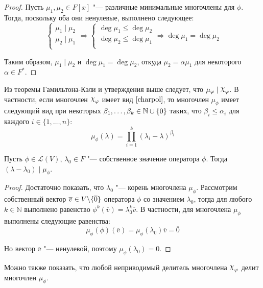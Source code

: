 \begin{proof}
	Пусть $\mu_1, \mu_2 \in F[x]$ "--- различные минимальные многочлены для $\phi$. Тогда, поскольку оба они ненулевые, выполнено следующее:
	\[\left\{\begin{aligned}
		\mu_1\mid \mu_2\\
		\mu_2\mid \mu_1\\
	\end{aligned}\right. \Rightarrow
	\left\{\begin{aligned}
		\deg{\mu_1} \le \deg{\mu_2}\\
		\deg{\mu_2} \le \deg{\mu_1}\\
	\end{aligned}\right. \Rightarrow \deg{\mu_1} = \deg{\mu_2}\]
	
	Таким образом, $\mu_1\mid \mu_2$ и $\deg{\mu_1} = \deg{\mu_2}$, откуда $\mu_2 = \alpha\mu_1$ для некоторого $\alpha \in F^*$.
\end{proof}

\begin{note}
	Из теоремы Гамильтона-Кэли и утверждения выше следует, что $\mu_\phi\mid \Chi_\phi$. В частности, если многочлен $\Chi_\phi$ имеет вид $\eqref*{charpol}$, то многочлен $\mu_\phi$ имеет следующий вид при некоторых $\beta_1, \dotsc, \beta_k \in \mathbb{N} \cup \{0\}$ таких, что $\beta_i \le \alpha_i$ для каждого $i \in \{1, \dotsc, n\}$:
	\[\mu_\phi(\lambda) = \prod_{i = 1}^k(\lambda_i - \lambda)^{\beta_i}\]
\end{note}

\begin{proposition}
	Пусть $\phi \in \mathcal{L}(V)$, $\lambda_0 \in F$ "--- собственное значение оператора $\phi$. Тогда $(\lambda - \lambda_0)\mid \mu_\phi$.
\end{proposition}

\begin{proof}
	Достаточно показать, что $\lambda_0$ "--- корень многочлена $\mu_\phi$. Рассмотрим собственный вектор $\overline{v} \in V \backslash \{\overline 0\}$ оператора $\phi$ со значением $\lambda_0$, тогда для любого $k \in \mathbb{N}$ выполнено равенство $\phi^k(\overline{v}) = \lambda_0^k\overline{v}$. В частности, для многочлена $\mu_\phi$ выполнены следующие равенства:
	\[\mu_\phi(\phi)(\overline{v}) = \mu_\phi(\lambda_0)\overline{v} = \overline{0}\]
	
	Но вектор $\overline{v}$ "--- ненулевой, поэтому $\mu_\phi(\lambda_0) = 0$.
\end{proof}

\begin{note}
	Можно также показать, что любой неприводимый делитель многочлена $\Chi_\phi$ делит многочлен $\mu_\phi$.
\end{note}


